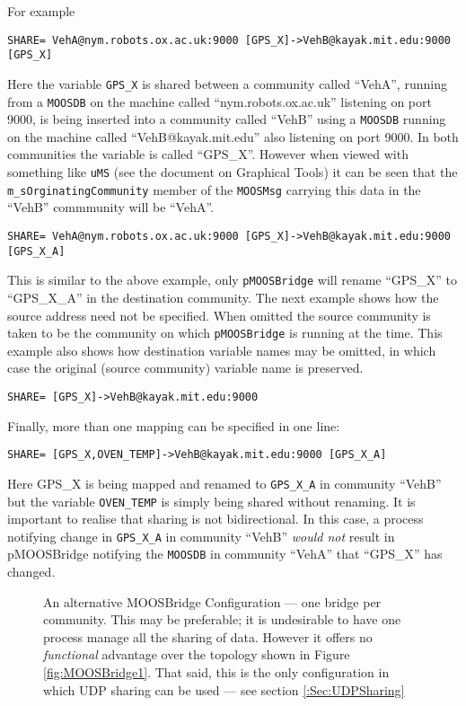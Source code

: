 \documentclass[a4paper,10pt]{article}
\newcommand{\Code}[1]{\texttt{#1} }
\newcommand{\code}[1]{\Code{#1} }
\newcommand{\DB}   {\code{{MOOSDB}}}
\begin{document}
For example\\
\begin{verbatim}
SHARE= VehA@nym.robots.ox.ac.uk:9000 [GPS_X]->VehB@kayak.mit.edu:9000 [GPS_X]
\end{verbatim}
Here the variable \code{GPS\_X} is shared between a community called ``VehA'', running from a \DB on the machine called
``nym.robots.ox.ac.uk'' listening on port 9000, is being inserted into a community called ``VehB'' using a \DB running on the machine called
``VehB@kayak.mit.edu'' also listening on port 9000. In both communities the variable is called ``GPS\_X''. However when viewed with
something like \code{uMS} (see the document on Graphical Tools) it can be seen that the \code{m\_sOrginatingCommunity} member of the \code{MOOSMsg}
carrying this data in the ``VehB'' commmunity will be ``VehA''.

\begin{verbatim}
SHARE= VehA@nym.robots.ox.ac.uk:9000 [GPS_X]->VehB@kayak.mit.edu:9000 [GPS_X_A]
\end{verbatim}
This is similar to the above example, only \code{pMOOSBridge} will rename ``GPS\_X'' to ``GPS\_X\_A'' in the
destination community. The next example shows how the source address need not be specified. When omitted the source community is
taken to be the community on which \code{pMOOSBridge} is running at the time. This example also shows how destination variable names may be omitted, in
which case the original (source community) variable name is preserved.
\begin{verbatim}
SHARE= [GPS_X]->VehB@kayak.mit.edu:9000
\end{verbatim}
Finally, more than one mapping can be specified in one line:
\begin{verbatim}
SHARE= [GPS_X,OVEN_TEMP]->VehB@kayak.mit.edu:9000 [GPS_X_A]
\end{verbatim}
Here GPS\_X is being mapped and renamed to \code{GPS\_X\_A} in community ``VehB'' but the variable \code{OVEN\_TEMP} is simply being shared without renaming.
It is important to realise that sharing is not bidirectional. In this case, a process notifying change in \code{GPS\_X\_A} in community ``VehB'' \emph{would not}
result in pMOOSBridge notifying the \DB in community ``VehA'' that ``GPS\_X'' has changed.


\begin{figure}[ht]
\centering {} \caption{An alternative MOOSBridge Configuration
--- one bridge per community. This may be preferable; it is undesirable to have one process manage all
the sharing of data. However it offers no \emph{functional} advantage over the topology shown in Figure
\ref{fig:MOOSBridge1}. That said, this is the only configuration in which UDP sharing can be used --- see section \ref{:Sec:UDPSharing}}\label{fig:MOOSBridge2}
\end{figure}
\end{document}
